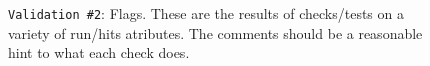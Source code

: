 \documentclass[12pt]{article}
\begin{document}
\begin{figure}
\centering
\noindent{}
  \caption{\centering \texttt{Validation \#2}: Flags. These are the results of checks/tests on a variety of run/hits atributes. The comments should be a reasonable hint to what each check does.}
  \label{fig:val24}
\end{figure}
\end{document}
